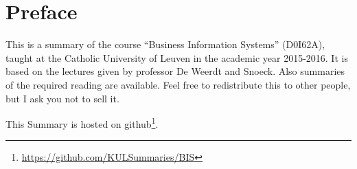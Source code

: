 \section*{Preface}
This is a summary of the course ``Business Information Systems'' (D0I62A), taught at the Catholic University of Leuven in the academic year 2015-2016. It is based on the lectures given by professor De Weerdt and Snoeck. Also summaries of the required reading are available. Feel free to redistribute this to other people, but I ask you not to sell it.

This Summary is hosted on github\footnote{\url{https://github.com/KULSummaries/BIS}}.
